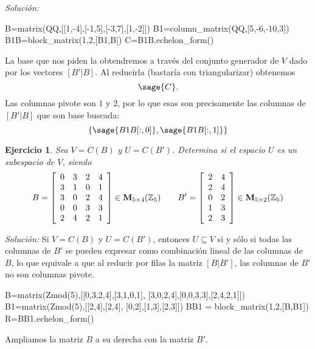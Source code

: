 \documentclass{amsart}
\newtheorem{ejer}{Ejercicio}
\begin{document}
{\it Soluci\'on:}
\begin{sageblock}
B=matrix(QQ,[[1,-4],[-1,5],[-3,7],[1,-2]])
B1=column_matrix(QQ,[5,-6,-10,3])
B1B=block_matrix(1,2,[B1,B])
C=B1B.echelon_form()
\end{sageblock}

La base que nos piden la obtendremos a través del conjunto generador de $V$ dado 
por los vectores $[B'|B]$. Al reducirla (bastaría con triangularizar) obtenemos
\[ \sage{C}. \]  Las columnas pivote son $1$ y $2$, por lo que esas son precisamente 
las columnas de $[B'|B]$ que son base buscada:
\[ \left\lbrace \sage{B1B[:,0]}, \sage{B1B[:,1]}  \right\rbrace \] 


\begin{ejer} Sea $V = C(B)$ y $U = C(B')$. Determina si el espacio $U$ es un subespacio de $V$, siendo 
\[B = \left[\begin{array}{rrrrr}
0 & 3 & 2 & 4 \\
3 & 1 & 0 & 1 \\
3 & 0 & 2 & 4 \\
0 & 0 & 3 & 3 \\
2 & 4 & 2 & 1
\end{array}\right] \in {\bf M}_{5 \times 4}({\mathbb Z}_{5}) \qquad
B' = \left[\begin{array}{rrrrr}
2 & 4 \\
2 & 4 \\
0 & 2 \\
1 & 3 \\
2 & 3
\end{array}\right] \in {\bf M}_{5 \times 2}({\mathbb Z}_{5}) \]
\end{ejer}

{\it Soluci\'on:}
Si $V=C(B)$ y $U=C(B')$, entonces $U\subseteq V$ si y sólo si todas las columnas 
de $B'$ se pueden expresar como combinación lineal de las columnas de $B$, lo 
que equivale a que al reducir por filas la matriz $[B|B']$, las columnas de $B'$ 
no son columnas pivote.

\begin{sageblock}
B=matrix(Zmod(5),[[0,3,2,4],[3,1,0,1],
[3,0,2,4],[0,0,3,3],[2,4,2,1]])
B1=matrix(Zmod(5),[[2,4],[2,4],
[0,2],[1,3],[2,3]])
BB1 = block_matrix(1,2,[B,B1])
R=BB1.echelon_form()
\end{sageblock}

Ampliamos la matriz $B$ a su derecha con la matriz $B'$.
\end{document}
